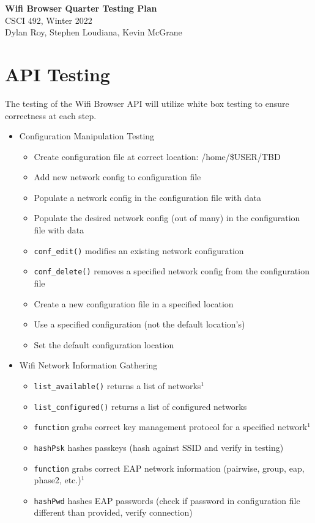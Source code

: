 \documentclass[11pt]{article}
\begin{document}
\begin{center}
  \textbf{\Large Wifi Browser Quarter Testing Plan}\\\large CSCI 492, Winter 2022\\
  Dylan Roy, Stephen Loudiana, Kevin McGrane
\end{center}

\section{API Testing}
The testing of the Wifi Browser API will utilize white box testing to ensure correctness at each step.
\begin{itemize}
  \item Configuration Manipulation Testing
  \begin{itemize}
    \item Create configuration file at correct location: /home/\$USER/TBD
    \item Add new network config to configuration file
    \item Populate a network config in the configuration file with data
    \item Populate the desired network config (out of many) in the configuration file with data
    \item \texttt{conf\_edit()} modifies an existing network configuration
    \item \texttt{conf\_delete()} removes a specified network config from the configuration file
    \item Create a new configuration file in a specified location
    \item Use a specified configuration (not the default location's)
    \item Set the default configuration location
  \end{itemize}

  \item Wifi Network Information Gathering
  \begin{itemize}
    \item \texttt{list\_available()} returns a list of networks$^1$ 
    \item \texttt{list\_configured()} returns a list of configured networks
    \item \texttt{function} grabs correct key management protocol for a specified network$^1$
    \item \texttt{hashPsk} hashes passkeys (hash against SSID and verify in testing)
    \item \texttt{function} grabs correct EAP network information (pairwise, group, eap, phase2, etc.)$^1$
    \item \texttt{hashPwd} hashes EAP passwords (check if password in configuration file different than provided, verify connection)
  \end{itemize}


\end{itemize}
\end{document}
